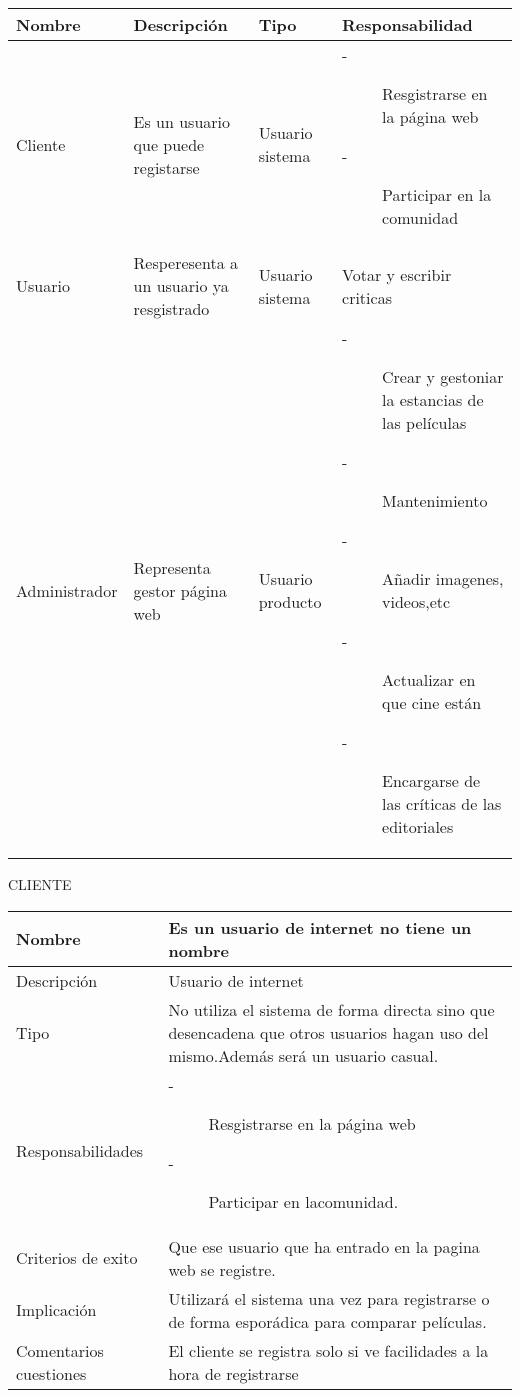\documentclass{article}
\begin{document}
\begin{table}[H]
    \begin{tabular}{||p{3cm} | p{3cm} | p{3cm} | p{3cm} ||}
    \hline
    \hline
    Nombre & Descripción & Tipo & Responsabilidad\\
    \hline
        Cliente & Es un usuario que puede registarse & Usuario sistema &                 \begin{description}
        \item[-] Resgistrarse en la página web 
        \item[-] Participar en la comunidad
        \end{description}\\
    \hline
    Usuario & Resperesenta a un usuario ya resgistrado & Usuario sistema & Votar y escribir criticas\\
    \hline
    Administrador & Representa gestor página web & Usuario producto & 
        \begin{description}
        \item[-] Crear y gestoniar la estancias de las películas
        \item[-] Mantenimiento 
        \item[-] Añadir imagenes, videos,etc 
        \item[-] Actualizar en que cine están 
        \item[-] Encargarse de las críticas de las editoriales  
        \end{description}\\
    \hline
    \hline
    \end{tabular}
\end{table}
\vspace{6cm}
CLIENTE
\begin{table}[H]
    \begin{tabular}{||p{4cm} | p{7cm} ||}
    \hline
    \hline
    Nombre & Es un usuario de internet no tiene un nombre \\
    \hline
    Descripción & Usuario de internet\\
    \hline
    Tipo & No utiliza el sistema de forma directa sino que desencadena que otros usuarios hagan uso del mismo.Además será un usuario casual. \\
    \hline
    Responsabilidades & 
        \begin{description}
        \item[-]Resgistrarse en la página web 
        \item[-]Participar en lacomunidad. 
        \end{description}\\
    \hline
    Criterios de exito & Que ese usuario que ha entrado en la pagina web se registre. \\
    \hline
    Implicación & Utilizará el sistema una vez para registrarse o de forma esporádica para comparar películas. \\
    \hline
    Comentarios cuestiones & El cliente se registra solo si ve facilidades a la hora de registrarse \\
    \hline
    \hline
    \end{tabular}
\end{table}
\end{document}
